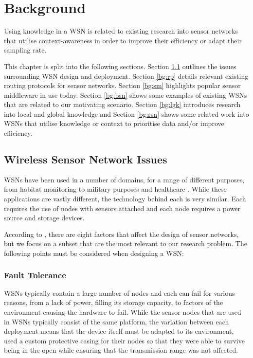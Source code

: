 \chapter{Background}
Using knowledge in a WSN is related to existing research into sensor networks that utilise context-awareness in order to improve their efficiency or adapt their sampling rate. 

This chapter is split into the following sections. Section \ref{bg:wsni} outlines the issues surrounding WSN design and deployment. 
Section \ref{bg:rp} details relevant existing routing protocols for sensor networks. Section \ref{bg:sm} highlights popular sensor middleware in use today. Section \ref{bg:bsn} shows some examples of existing WSNs that are related to our motivating scenario. Section \ref{bg:lgk} introduces research into local and global knowledge and Section \ref{bg:rsn} shows some related work into WSNs that utilise knowledge or context to prioritise data and/or improve efficiency.

\section{Wireless Sensor Network Issues} \label{bg:wsni}

WSNs have been used in a number of domains, for a range of different purposes, from habitat monitoring \cite{Szewczyk2004a} to military purposes \cite{Pizzocaro} and healthcare \cite{Otto2006}. While these applications are vastly different, the technology behind each is very similar. Each requires the use of nodes with sensors attached and each node requires a power source and storage devices.

According to \cite{Akyildiz2002}, there are eight factors that affect the design of sensor networks, but we focus on a subset that are the most relevant to our research problem. The following points must be considered when designing a WSN:

\subsection{Fault Tolerance}
	WSNs typically contain a large number of nodes and each can fail for various reasons, from a lack of power, filling its storage capacity, to factors of the environment causing the hardware to fail. While the sensor nodes that are used in WSNs typically consist of the same platform, the variation between each deployment means that the device itself must be adapted to its environment, \cite{Mainwaring2002} used a custom protective casing for their nodes so that they were able to survive being in the open while ensuring that the transmission range was not affected.


